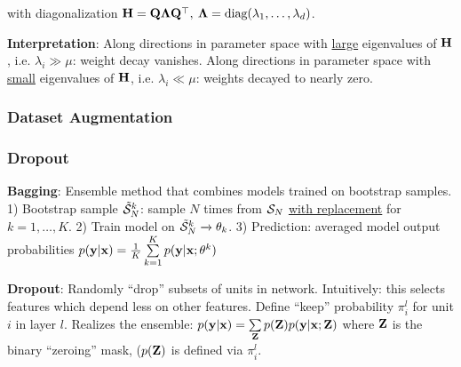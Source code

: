         \tab with diagonalization $\mathbf H=\mathbf Q\mathbf \Lambda\mathbf Q^{\mathop{\mathrm{\top}}},\>\mathbf \Lambda=\text{diag}(\lambda_1,\ldots,\lambda_d)$.
        
        \textbf{Interpretation}: Along directions in parameter space with \underline{large} eigenvalues of $\mathbf H$, i.e. $\lambda_i\gg\mu$: weight decay vanishes. Along directions in parameter space with \underline{small} eigenvalues of $\mathbf H$, i.e. $\lambda_i\ll\mu$: weights decayed to nearly zero.
        
    
    \subsubsection{Dataset Augmentation}
    \label{ssub:datasetaugmentation}
    
    \subsubsection{Dropout}
    \label{ssub:dropout}
    \textbf{Bagging}: Ensemble method that combines models trained on bootstrap samples. 1) Bootstrap sample $\Tilde{\mathcal{S}}^k_N$: sample $N$ times from $\mathcal{S}_N$ \underline{with replacement} for $k=1,\ldots,K$. 2) Train model on $\Tilde{\mathcal{S}}^k_N\xrightarrow{}\theta_k$. 3) Prediction: averaged model output probabilities $p(\mathbf y|\mathbf x)=\frac{1}{K}\sum\limits^K_{k=1}p(\mathbf y|\mathbf x;\theta^k)$
    
    \textbf{Dropout}: Randomly ``drop'' subsets of units in network. Intuitively: this selects features which depend less on other features. Define ``keep'' probability $\pi^l_i$ for unit $i$ in layer $l$. Realizes the ensemble: $p(\mathbf y|\mathbf x)=\sum\limits_\mathbf Z p(\mathbf Z)p(\mathbf y|\mathbf x;\mathbf Z)$ where $\mathbf Z$ is the binary ``zeroing'' mask, ($p(\mathbf Z)$ is defined via $\pi^l_i$.
    
    
